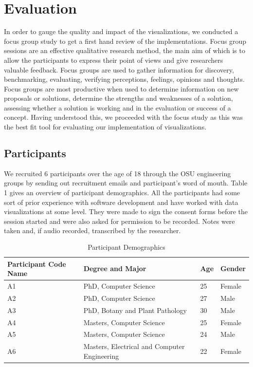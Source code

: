 \documentclass[seploa]{beavtex}
\begin{document}
\chapter{Evaluation}
In order to gauge the quality and impact of the visualizations, we conducted a focus group study to get a first hand review of the implementations. Focus group sessions are an effective qualitative research method, the main aim of which is to allow the participants to express their point of views and give researchers valuable feedback\cite{villard}.  Focus groups are used to gather information for discovery, benchmarking, evaluating, verifying perceptions, feelings, opinions and thoughts\cite{patton1990}. Focus groups are most productive when used to determine information on new proposals or solutions, determine the strengths and weaknesses of a solution, assessing whether a solution is working and in the evaluation or success of a concept\cite{greenbaum1993}. Having understood this, we proceeded with the focus study as this was the best fit tool for evaluating our implementation of visualizations.

\section{Participants}
We recruited 6 participants over the age of 18 through the OSU engineering groups by sending out recruitment emails and participant's word of mouth. Table 1 gives an overview of participant demographics. All the participants had some sort of prior experience with software development and have worked with data visualizations at some level. They were made to sign the consent forms before the session started and were also asked for permission to be recorded. Notes were taken and, if audio recorded, transcribed by the researcher.

\begin{table}
\centering
\begin{tabular}{ |p{3cm}||p{5cm}|p{3cm}|p{3cm}|  }
 \hline
Participant Code Name & Degree and Major & Age & Gender\\
 \hline
 A1 & PhD, Computer Science & 25 & Female\\
 A2 & PhD, Computer Science & 27 & Male\\
 A3 & PhD, Botany and Plant Pathology & 30 & Male\\
 A4 & Masters, Computer Science & 25 & Female\\
 A5 & Masters, Computer Science & 24 & Male\\
 A6 & Masters, Electrical and Computer Engineering & 22 & Female\\
 \hline
\end{tabular}
\caption{Participant Demographics}
\label{tab:table1}
\end{table}
\end{document}

